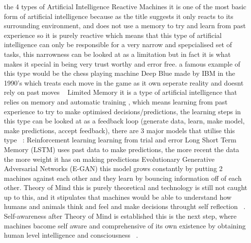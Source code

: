     the 4 types of Artificial Intelligence
        Reactive Machines
            it is one of the most basic form of artificial intelligence because as the title suggests it only reacts to its surrounding environment, and does not use a memory to try and learn from past experience so it is purely reactive which means that this type of artificial intelligence can only be responsible for a very narrow and spepcialised set of tasks, this narrowness can be looked at as a limitation but in fact it is what makes it special in being very trust worthy and error free. a famous example of this type would be the chess playing machine Deep Blue made by IBM in the 1990's which treats each move in the game as it own seperate reality and doesnt rely on past moves ~\cite{ai}
        Limited Memory
            it is a type of artificial intelligence that relies on memory and automatic training , which means learning from past experience to try to make optimised decisions/predictions, the learning steps in this type can be looked at as a feedback loop (generate data, learn, make model, make predictions, accept feedback), there are 3 major models that utilise this type ~\cite{ai}: 
                Reinforcement learning
                    learning from trial and error
                Long Short Term Memory (LSTM)
                    uses past data to make predictions, the more recent the data the more weight it has on making predictions
                Evolutionary Generative Adversarial Networks (E-GAN)
                    this model grows constantly by putting 2 machines against each other and they learn by bouncing information off of each other. 
        Theory of Mind
            this is purely theoretical and technology is still not caught up to this, and it stipulates that machines would be able to understand how humans and animals think and feel and make decisions throught self reflection ~\cite{ai}.
        Self-awareness
            after Theory of Mind is established this is the next step, where machines bacome self aware and comprehensive of its own existence by obtaining human level intelligence and consciousness ~\cite{ai}.
    
